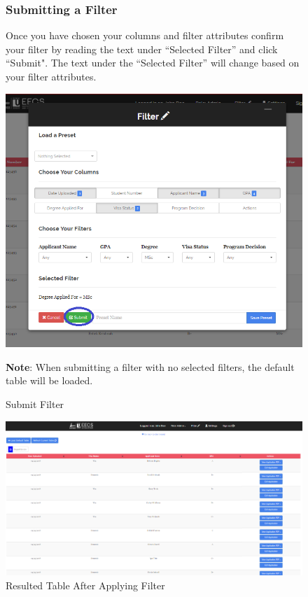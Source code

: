\documentclass[fontsize=12pt,paper=letter,twoside]{scrartcl}
\begin{document}
\clearpage 
\begin{figure}[!htb]
\subsubsection{Submitting a Filter}
Once you have chosen your columns and filter attributes confirm your filter by reading the text under ``Selected Filter'' and click ``Submit". The text under the ``Selected Filter'' will change based on your filter attributes.

\begin{center}
\includegraphics[width=.99\textwidth]{images/ma/submit_filter.png}
\end{center}
\caption{Submit Filter}
\textbf{Note}: When submitting a filter with no selected filters, the default table will be loaded.
\label{fig:submit_filter}
\end{figure}

\begin{figure}[!htb]
\begin{center}
\includegraphics[width=.99\textwidth]{images/ma/example_filter_table.png}
\end{center}
\caption{Resulted Table After Applying Filter}
\label{fig:resulted_table}
\end{figure}
\end{document}
